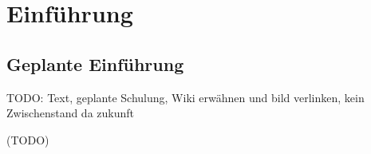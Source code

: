 \section{Einführung}
\label{sec:Einführung}
\subsection{Geplante Einführung}
\label{subsec:EinführungGeplant}

TODO: Text, geplante Schulung, Wiki erwähnen und bild verlinken, kein Zwischenstand da zukunft

(TODO)


